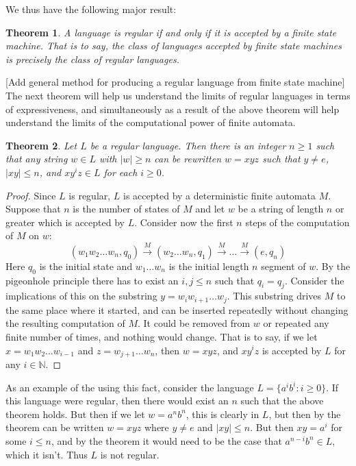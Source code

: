 \documentclass{article}
\theoremstyle{definition}
\theoremstyle{plain}
\theoremstyle{theorem}
\newtheorem{theorem}{Theorem}[section]
\begin{document}
We thus have the following major result:
\begin{theorem}
	A language is regular if and only if it is accepted by a finite state machine. That is to say, the class of languages accepted by finite state machines is precisely the class of regular languages. 
\end{theorem}
[Add general method for producing a regular language from finite state machine] \\
The next theorem will help us understand the limits of regular languages in terms of expressiveness, and simultaneously as a result of the above theorem will help understand the limits of the computational power of finite automata.
\begin{theorem}
	Let $L$ be a regular language. Then there is an integer $n \geq 1$ such that any string $w \in L$ with $|w| \geq n$ can be rewritten $w=xyz$ such that $y \neq e$, $|xy| \leq n$, and $xy^iz \in L$ for each $i \geq 0$.
\end{theorem}
\begin{proof}
	Since $L$ is regular, $L$ is accepted by a deterministic finite automata $M$. Suppose that $n$ is the number of states of $M$ and let $w$ be a string of length $n$ or greater which is accepted by $L$. Consider now the first $n$ steps of the computation of $M$ on $w$:
	\[ (w_1w_2\ldots w_n,q_0) \overset{M}{\to} (w_2\ldots w_n,q_1) \overset{M}{\to} \ldots \overset{M}{\to} (e,q_n) \] 
	Here $q_0$ is the initial state and $w_1\ldots w_n$ is the initial length $n$ segment of $w$. By the pigeonhole principle there has to exist an $i,j \leq n$ such that $q_i = q_j$. Consider the implications of this on the substring $y = w_iw_{i+1} \ldots w_j$. This substring drives $M$ to the same place where it started, and can be inserted repeatedly without changing the resulting computation of $M$. It could be removed from $w$ or repeated any finite number of times, and nothing would change. That is to say, if we let $x = w_1w_2\ldots w_{i-1}$ and $z = w_{j+1}\ldots w_n$, then $w = xyz$, and $xy^iz$ is accepted by $L$ for any $i \in \mathbb{N}$. 
\end{proof}
As an example of the using this fact, consider the language $L = \{a^ib^i: i \geq 0\}$. If this language were regular, then there would exist an $n$ such that the above theorem holds. But then if we let $w = a^nb^n$, this is clearly in $L$, but then by the theorem can be written $w = xyz$ where $y \neq e$ and $|xy| \leq n$. But then $xy = a^i$ for some $i \leq n$, and by the theorem it would need to be the case that $a^{n-i}b^n \in L$, which it isn't. Thus $L$ is not regular. \par 
\end{document}
